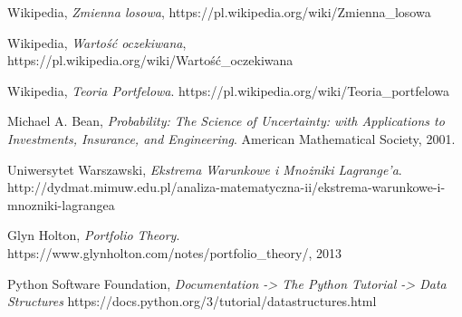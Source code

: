 \documentclass[magister]{dyplom}
\begin{document}
\begin{thebibliography}{9}
	Wikipedia,
	\emph{Zmienna losowa},
	https://pl.wikipedia.org/wiki/Zmienna\_losowa
	
	Wikipedia,
	\emph{Wartość oczekiwana},
	https://pl.wikipedia.org/wiki/Wartość\_oczekiwana
	
	Wikipedia,
	\emph{Teoria Portfelowa}.
	https://pl.wikipedia.org/wiki/Teoria\_portfelowa
	
	Michael A. Bean,
	\emph{Probability: The Science of Uncertainty: with Applications to Investments, Insurance, and Engineering}.
	American Mathematical Society, 2001.
	
	Uniwersytet Warszawski,
	\emph{Ekstrema Warunkowe i Mnożniki Lagrange'a}.
	http://dydmat.mimuw.edu.pl/analiza-matematyczna-ii/ekstrema-warunkowe-i-mnozniki-lagrangea
	
	Glyn Holton,
	\emph{Portfolio Theory}.
	https://www.glynholton.com/notes/portfolio\_theory/,
	2013
	
	Python Software Foundation,
	\emph{Documentation -> The Python Tutorial -> Data Structures}
	https://docs.python.org/3/tutorial/datastructures.html
	
\end{thebibliography}
\begin{comment}
Można więc stworzyć układ równań:

$$
\left\{ \begin{array}{l}
2{\sigma_1}^2w_1 + 2\sigma_{12}w_2 - \tau(\mu_1 - r_f) = 0\\
2{\sigma_2}^2w_2 + 2\sigma_{12}w_1 - \tau(\mu_2 - r_f) = 0\\
(\mu_1 - r_f)w_1 + (\mu_2 - r_f)w_2 - \mu_p + r_f = 0
\end{array} \right.
$$

Przekształcając pierwsze dwa równania otrzymujemy:

$$
\left\{ \begin{array}{l}
{\sigma_1}^2w_1 + \sigma_{12}w_2 = \frac{\tau}{2}(\mu_1 - r_f)\\
{\sigma_2}^2w_2 + \sigma_{12}w_1 = \frac{\tau}{2}(\mu_2 - r_f)\\
(\mu_1 - r_f)w_1 + (\mu_2 - r_f)w_2 - \mu_p + r_f = 0
\end{array} \right.
$$



\begin{equation}
\left( \begin{array}{cc}
{\sigma_1}^2 & \sigma_{12}\\
\sigma_{12} & {\sigma_2}^2
\end{array} \right)
\left( \begin{array}{c}
w_1\\
w_2
\end{array} \right) =
(\frac{\tau}{2})
\left( \begin{array}{c}
\mu_1 - r_f\\
\mu_2 - r_f
\end{array} \right)
\end{equation}
\end{comment}
\end{document}
